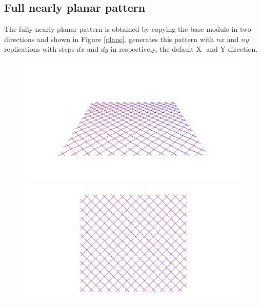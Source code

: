 \subsection{Full nearly planar pattern}

The fully nearly planar pattern is obtained by copying the base module in two directions and shown in Figure \ref{plane}.  generates this pattern with $nx$ and $ny$ replications with steps $dx$ and $dy$ in respectively, the default X- and Y-direction.
%


\begin{figure} [ht]
   \centering
   \begin{makeimage}
   \end{makeimage}
   \begin{latexonly}
	\hspace{0.1cm}
	\begin{minipage} [c] [] [c]{5.5cm} 
	\includegraphics [width =\textwidth] {images/WireStentDemot2Step12}
	\begin{center}
	\vspace{-3ex}
	\vspace{1ex}
	\end{center}
\end{minipage}
\hspace{0.3cm}
\begin{minipage} [c] [] [c] {5.5cm}
	\includegraphics [width =\textwidth] {images/WireStentDemot2Step13}

\end{minipage}
\end{latexonly}
\end{figure}
